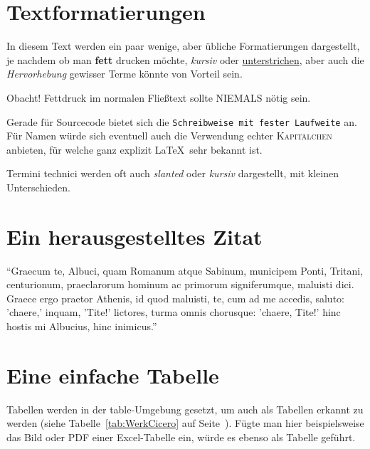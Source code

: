 \section{Textformatierungen}

In diesem Text werden ein paar wenige, aber übliche Formatierungen dargestellt,
je nachdem ob man \textbf{fett} drucken möchte, \textit{kursiv} oder \underline{unterstrichen}, aber auch die \emph{Hervorhebung}
gewisser Terme könnte von Vorteil sein.

Obacht! Fettdruck im normalen Fließtext sollte NIEMALS nötig sein.

Gerade für Sourcecode bietet sich die \texttt{Schreibweise mit fester Laufweite} an. Für Namen würde sich eventuell auch
die Verwendung echter \textsc{Kapitälchen} anbieten, für welche ganz explizit \LaTeX~sehr bekannt ist.

Termini technici werden oft auch \textsl{slanted} oder \textit{kursiv} dargestellt, mit kleinen Unterschieden.


\section{Ein herausgestelltes Zitat}
\begin{zitat}
    "`Graecum te, Albuci, quam Romanum atque Sabinum,
    municipem Ponti, Tritani, centurionum,
    praeclarorum hominum ac primorum signiferumque,
    maluisti dici. Graece ergo praetor Athenis,
    id quod maluisti, te, cum ad me accedis, saluto:
    'chaere,' inquam, 'Tite!' lictores, turma omnis chorusque:
    'chaere, Tite!' hinc hostis mi Albucius, hinc inimicus."'
\end{zitat}


\section{Eine einfache Tabelle}

Tabellen werden in der table-Umgebung gesetzt, um auch als Tabellen erkannt zu werden (siehe Tabelle~\ref{tab:WerkCicero} auf Seite~\pageref{tab:WerkCicero}). Fügte man hier beispielsweise das Bild oder PDF einer Excel-Tabelle ein, würde es ebenso  als Tabelle geführt.

